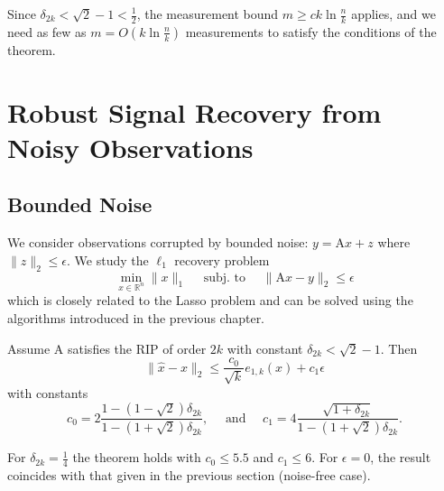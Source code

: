 \documentclass[11pt]{elegantbook}
\begin{document}
Since $\delta_{2 k}<\sqrt{2}-1<\frac{1}{2}$, the measurement bound $m\geq ck\ln\frac{n}{k}$ applies, and we need as few as $m=O\left(k \ln \frac{n}{k}\right)$ measurements to satisfy the conditions of the theorem.

\section{Robust Signal Recovery from Noisy Observations}
\subsection{Bounded Noise}
We consider observations corrupted by bounded noise: $y=\mathrm{A} x+z$ where $\|z\|_2 \leq \epsilon$. We study the $\ell_1$ recovery problem
$$
\min _{x \in \mathbb{R}^n}\|x\|_1 \quad \text { subj. to } \quad\|\mathrm{A} x-y\|_2 \leq \epsilon
$$
which is closely related to the Lasso problem and can be solved using the algorithms introduced in the previous chapter.
\begin{theorem}
    Assume A satisfies the RIP of order $2 k$ with constant $\delta_{2 k}<\sqrt{2}-1$. Then
    $$
    \|\hat{x}-x\|_2 \leq \frac{c_0}{\sqrt{k}} e_{1, k}(x)+c_1 \epsilon
    $$
    with constants
    $$
    c_0=2 \frac{1-(1-\sqrt{2}) \delta_{2 k}}{1-(1+\sqrt{2}) \delta_{2 k}}, \quad \text { and } \quad c_1=4 \frac{\sqrt{1+\delta_{2 k}}}{1-(1+\sqrt{2}) \delta_{2 k}} .
    $$
\end{theorem}
For $\delta_{2 k}=\frac{1}{4}$ the theorem holds with $c_0 \leq 5.5$ and $c_1 \leq 6$. For $\epsilon=0$, the result coincides with that given in the previous section (noise-free case).
\end{document}
